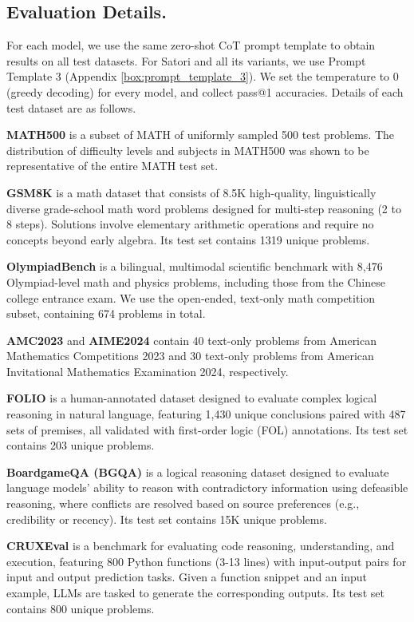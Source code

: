 \subsection{Evaluation Details.}
\label{app:eval}
For each model, we use the same zero-shot CoT prompt template to obtain results on all test datasets. For Satori and all its variants, we use Prompt Template 3 (Appendix \ref{box:prompt_template_3}). We set the temperature to 0 (greedy decoding) for every model, and collect pass@1 accuracies. Details of each test dataset are as follows.

\textbf{MATH500} \cite{prm800k} is a subset of MATH \cite{MATH} of uniformly sampled 500 test problems. The distribution of difficulty levels and subjects in MATH500 was shown to be representative of the entire MATH test set.

\textbf{GSM8K} \cite{GSM8K} is a math dataset that consists of 8.5K high-quality, linguistically diverse grade-school math word problems designed for multi-step reasoning (2 to 8 steps). Solutions involve elementary arithmetic operations and require no concepts beyond early algebra. Its test set contains 1319 unique problems.

\textbf{OlympiadBench} \cite{olympiadbench} is a bilingual, multimodal scientific benchmark with 8,476 Olympiad-level math and physics problems, including those from the Chinese college entrance exam. We use the open-ended, text-only math competition subset, containing 674 problems in total. 

\textbf{AMC2023} and \textbf{AIME2024} contain 40 text-only problems from American Mathematics Competitions 2023 and 30 text-only problems from American Invitational Mathematics Examination 2024, respectively.

\textbf{FOLIO} \cite{folio} is a human-annotated dataset designed to evaluate complex logical reasoning in natural language, featuring 1,430 unique conclusions paired with 487 sets of premises, all validated with first-order logic (FOL) annotations. Its test set contains 203 unique problems.

\textbf{BoardgameQA (BGQA)} \cite{bgqa} is a logical reasoning dataset designed to evaluate language models' ability to reason with contradictory information using defeasible reasoning, where conflicts are resolved based on source preferences (e.g., credibility or recency). Its test set contains 15K unique problems.

\textbf{CRUXEval} \cite{cruxeval} is a benchmark for evaluating code reasoning, understanding, and execution, featuring 800 Python functions (3-13 lines) with input-output pairs for input and output prediction tasks. Given a function snippet and an input example, LLMs are tasked to generate the corresponding outputs. Its test set contains 800 unique problems.

